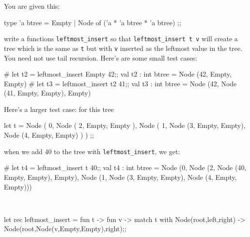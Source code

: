 

\renewcommand\AUTHOR{jdoe5@cougars.ccis.edu} %


\topmattertwo


\nextq
You are given this:
\begin{console}[fontsize=\small]
type 'a btree = Empty
              | Node of ('a * 'a btree * 'a btree)
;;
\end{console}
write a functions \verb!leftmost_insert!
so that \verb!leftmost_insert t v! will create a tree which is
the same as \verb!t! but with \verb!v! inserted as the leftmost value
in the tree.
You need not use tail recursion.
Here's are some small test cases:
\begin{console}[fontsize=\small]
# let t2 = leftmost_insert Empty 42;;
val t2 : int btree = Node (42, Empty, Empty)
# let t3 = leftmost_insert t2 41;;
val t3 : int btree = Node (42, Node (41, Empty, Empty), Empty)
\end{console}
Here's a larger test case: for this tree
\begin{console}[fontsize=\small]
let t =
  Node (
    0,
    Node (
      2,
      Empty,
      Empty
    ),
    Node (
      1,
      Node (3, Empty, Empty),
      Node (4, Empty, Empty)
    )
  )
;;
\end{console}
when we add 40 to the tree with \verb!leftmost_insert!, we get:
\begin{console}[fontsize=\small]
# let t4 = leftmost_insert t 40;;
val t4 : int btree =
  Node
   (0, Node (2, Node (40, Empty, Empty), Empty),
    Node (1, Node (3, Empty, Empty), Node (4, Empty, Empty)))
\end{console}
\\
\ANSWER
\begin{answercode}

  let rec leftmost_insert = fun t -> fun v -> 
  match t with Node(root,left,right) -> Node(root,Node(v,Empty,Empty),right);;
\end{answercode}

\newpage


